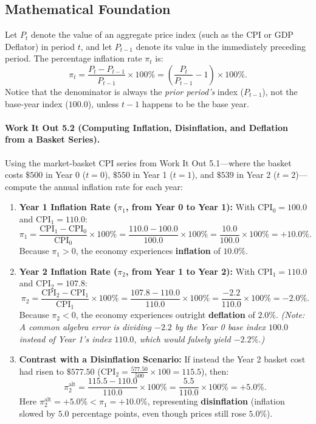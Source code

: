 \documentclass[11pt,letterpaper]{article}
\begin{document}
\subsection*{Mathematical Foundation}
Let $P_t$ denote the value of an aggregate price index (such as the CPI or GDP Deflator) in period $t$, and let $P_{t-1}$ denote its value in the immediately preceding period. The percentage inflation rate $\pi_t$ is:
\begin{equation}
\pi_t = \frac{P_t - P_{t-1}}{P_{t-1}} \times 100\% = \left(\frac{P_t}{P_{t-1}} - 1\right) \times 100\%.
\end{equation}
Notice that the denominator is always the \emph{prior period's} index ($P_{t-1}$), not the base-year index ($100.0$), unless $t - 1$ happens to be the base year.

\paragraph{Work It Out 5.2 (Computing Inflation, Disinflation, and Deflation from a Basket Series).}
Using the market-basket CPI series from Work It Out 5.1—where the basket costs $\$500$ in Year 0 ($t = 0$), $\$550$ in Year 1 ($t = 1$), and $\$539$ in Year 2 ($t = 2$)—compute the annual inflation rate for each year:
\begin{enumerate}
    \item \textbf{Year 1 Inflation Rate ($\pi_1$, from Year 0 to Year 1):}
    With $\text{CPI}_0 = 100.0$ and $\text{CPI}_1 = 110.0$:
    $$\pi_1 = \frac{\text{CPI}_1 - \text{CPI}_0}{\text{CPI}_0} \times 100\% = \frac{110.0 - 100.0}{100.0} \times 100\% = \frac{10.0}{100.0} \times 100\% = +10.0\%.$$
    Because $\pi_1 > 0$, the economy experiences \textbf{inflation} of $10.0\%$.
    \item \textbf{Year 2 Inflation Rate ($\pi_2$, from Year 1 to Year 2):}
    With $\text{CPI}_1 = 110.0$ and $\text{CPI}_2 = 107.8$:
    $$\pi_2 = \frac{\text{CPI}_2 - \text{CPI}_1}{\text{CPI}_1} \times 100\% = \frac{107.8 - 110.0}{110.0} \times 100\% = \frac{-2.2}{110.0} \times 100\% = -2.0\%.$$
    Because $\pi_2 < 0$, the economy experiences outright \textbf{deflation} of $2.0\%$. \emph{(Note: A common algebra error is dividing $-2.2$ by the Year 0 base index $100.0$ instead of Year 1's index $110.0$, which would falsely yield $-2.2\%$.)}
    \item \textbf{Contrast with a Disinflation Scenario:}
    If instead the Year 2 basket cost had risen to $\$577.50$ ($\text{CPI}_2 = \frac{577.50}{500} \times 100 = 115.5$), then:
    $$\pi_2^{\text{alt}} = \frac{115.5 - 110.0}{110.0} \times 100\% = \frac{5.5}{110.0} \times 100\% = +5.0\%.$$
    Here $\pi_2^{\text{alt}} = +5.0\% < \pi_1 = +10.0\%$, representing \textbf{disinflation} (inflation slowed by $5.0$ percentage points, even though prices still rose $5.0\%$).
\end{enumerate}
\end{document}
